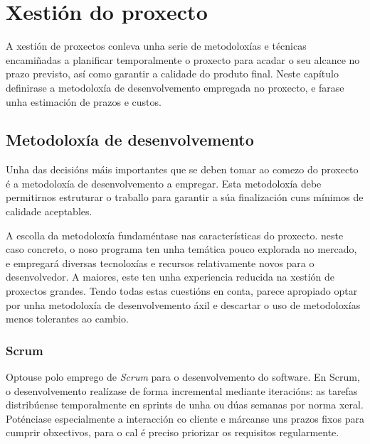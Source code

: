 \chapter{Xestión do proxecto}


A xestión de proxectos conleva unha serie de metodoloxías e técnicas encamiñadas
a planificar temporalmente o proxecto para acadar o seu alcance no prazo
previsto, así como garantir a calidade do produto final. Neste capítulo
definirase a metodoloxía de desenvolvemento empregada no proxecto, e farase unha
estimación de prazos e custos.

\section{Metodoloxía de desenvolvemento}
Unha das decisións máis importantes que se deben tomar ao comezo do proxecto é a
metodoloxía de desenvolvemento a empregar. Esta metodoloxía debe permitirnos
estruturar o traballo para garantir a súa finalización cuns mínimos
de calidade aceptables.
\par
A escolla da metodoloxía fundaméntase nas características do proxecto. neste
caso concreto, o noso programa ten unha temática pouco explorada no
mercado, e empregará diversas tecnoloxías e recursos relativamente novos para o
desenvolvedor. A maiores, este ten unha experiencia reducida na xestión de
proxectos grandes. Tendo todas estas cuestións en conta, parece apropiado optar
por unha metodoloxía de desenvolvemento áxil e descartar o uso de metodoloxías
menos tolerantes ao cambio.

\subsection{Scrum}
Optouse polo emprego de \textit{Scrum}\cite{scrum} para o desenvolvemento do
software.
En Scrum, o desenvolvemento realízase de forma incremental mediante iteracións:
as tarefas distribúense temporalmente en sprints de unha ou dúas semanas por
norma xeral. Poténciase especialmente a interacción co cliente e márcanse uns
prazos fixos para cumprir obxectivos, para o cal é preciso priorizar os
requisitos regularmente.

